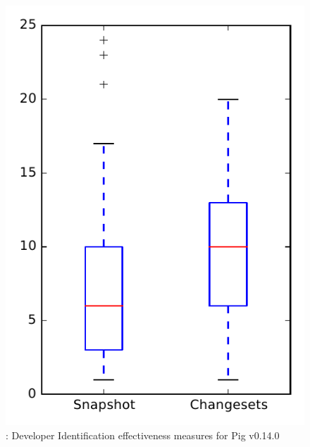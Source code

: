 
\begin{figure}
\centering
\includegraphics[height=0.4\textheight]{figures/dit/rq1_pig}
\caption{\done: Developer Identification effectiveness measures for Pig v0.14.0}
\label{fig:dit:rq1:pig}
\end{figure}
